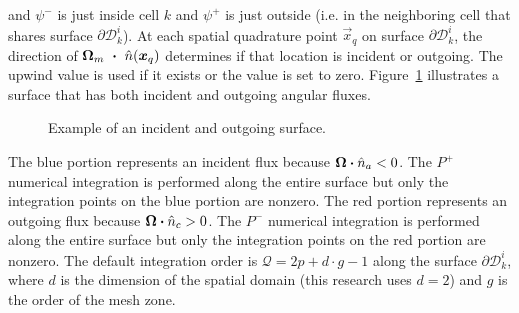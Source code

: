 \documentclass[12pt]{article}
\begin{document}
\noindent and $\psi^-$ is just inside cell $k$ and $\psi^+$ is just outside (i.e. in the neighboring cell that shares surface $\partial \mathcal{D}_k^i$). At each spatial quadrature point $\vec{x}_q$ on surface $\partial \mathcal{D}_k^i$, the direction of $\bm{\Omega}_m~\bm{\cdot}~\hat{n}(\bm{x}_q)$ determines if that location is incident or outgoing. The upwind value is used if it exists or the value is set to zero. Figure~\ref{fig:IncidentOutgoingSurface} illustrates a surface that has both incident and outgoing angular fluxes.
%
\begin{figure}[!htb]
\caption{Example of an incident and outgoing surface.}
\label{fig:IncidentOutgoingSurface}
\end{figure}
%
The blue portion represents an incident flux because $\bm{\Omega} \bm{\cdot} \hat{n}_a < 0$. The $P^+$ numerical integration is performed along the entire surface but only the integration points on the blue portion are nonzero. The red portion represents an outgoing flux because $\bm{\Omega} \bm{\cdot} \hat{n}_c > 0$. The $P^-$ numerical integration is performed along the entire surface but only the integration points on the red portion are nonzero. The default integration order is $\mathcal{Q} = 2p+d \cdot g -1$ along the surface $\partial \mathcal{D}_k^i$, where $d$ is the dimension of the spatial domain (this research uses $d=2$) and $g$ is the order of the mesh zone.
\end{document}
